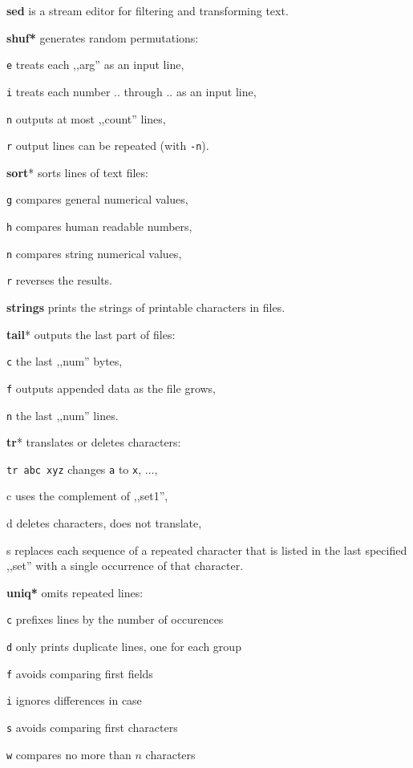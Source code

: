 \textbf{sed} is a stream editor for filtering and transforming text.

\textbf{shuf*} generates random permutations:
\begin{enumx}
	\item [\texttt{e}] treats each ,,arg'' as an input line,
	\item [\texttt{i}] treats each number .. through .. as an input line, 
	\item [\texttt{n}] outputs at most ,,count'' lines,
	\item [\texttt{r}] output lines can be repeated (with \texttt{-n}).
\end{enumx}

\textbf{sort}* sorts lines of text files:
\begin{enumx}
	\item [\texttt{g}] compares general numerical values,
	\item [\texttt{h}] compares human readable numbers,
	\item [\texttt{n}] compares string numerical values,
	\item [\texttt{r}] reverses the results.
\end{enumx}

\textbf{strings} prints the strings of printable characters in files.

\textbf{tail}* outputs the last part of files:
\begin{enumx}
	\item [\texttt{c}] the last ,,num'' bytes,
	\item [\texttt{f}] outputs appended data as the file grows,
	\item [\texttt{n}] the last ,,num'' lines.
\end{enumx}

\textbf{tr}* translates or deletes characters:
\begin{enumx}
	\item \texttt{tr abc xyz} changes \texttt{a} to \texttt{x}, $\ldots$,
	\item [c] uses the complement of ,,set1'',
	\item [d] deletes characters, does not translate,
	\item [s] replaces each sequence of a repeated character that is listed 
	in the last specified ,,set'' with a single occurrence of that character.
\end{enumx}

\textbf{uniq*} omits repeated lines:
\begin{enumx}
	\item [\texttt{c}] prefixes lines by the number of occurences
	\item [\texttt{d}] only prints duplicate lines, one for each group
	\item [\texttt{f}] avoids comparing first fields
	\item [\texttt{i}] ignores differences in case
	\item [\texttt{s}] avoids comparing first characters
	\item [\texttt{w}] compares no more than $n$ characters
\end{enumx}

